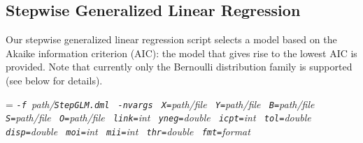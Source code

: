 \subsection{Stepwise Generalized Linear Regression}

\smallskip

Our stepwise generalized linear regression script selects a model based on the Akaike information criterion (AIC): the model that gives rise to the lowest AIC is provided. Note that currently only the Bernoulli distribution family is supported (see below for details). \\

\smallskip
{}
\smallskip

{\hangindent=\parindent\noindent\it%
{\tt{}-f }path/\/{\tt{}StepGLM.dml}
{\tt{} -nvargs}
{\tt{} X=}path/file
{\tt{} Y=}path/file
{\tt{} B=}path/file
{\tt{} S=}path/file
{\tt{} O=}path/file
{\tt{} link=}int
{\tt{} yneg=}double
{\tt{} icpt=}int
{\tt{} tol=}double
{\tt{} disp=}double
{\tt{} moi=}int
{\tt{} mii=}int
{\tt{} thr=}double
{\tt{} fmt=}format

}


